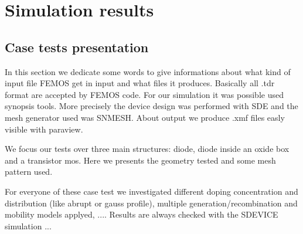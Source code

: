 \chapter{Simulation results}


\section{Case tests presentation}

In this section we dedicate some words to give informations about what kind of input file FEMOS get in input and what files it produces.
Basically all .tdr format are accepted by FEMOS code. For our simulation it was possible used synopsis tools. More precisely the device design was performed with SDE and the mesh generator used 
was SNMESH. About output we produce .xmf files easly visible with paraview.

 We focus our tests over three main structures: diode, diode inside an oxide box and a transistor mos.  
Here we presents the geometry tested and some mesh pattern used.

\begin{figure}[!h]
\end{figure}

 For everyone of these case test we investigated different doping concentration and distribution (like abrupt or gauss profile), multiple generation/recombination and mobility models applyed, ....
Results are always checked with the SDEVICE simulation ...
